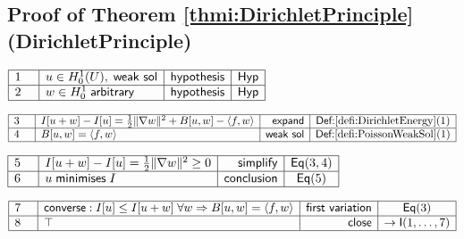 \documentclass[11pt,reqno]{amsart}
\begin{document}
	\subsection*{Proof of Theorem \protect\ref{thmi:DirichletPrinciple} (\textsf{DirichletPrinciple})}
	\noindent$\begin{array}{|m{0.5cm}|l|r|c|}
	\hline
	1 & u\in H_{0}^{1}(U),\;\mathsf{weak\ sol} & \mathsf{hypothesis} & \mathsf{Hyp} \\ \hline
	2 & w\in H_{0}^{1}\;\mathsf{arbitrary} & \mathsf{hypothesis} & \mathsf{Hyp} \\ \hline
	\end{array}$
	\par\nointerlineskip\noindent$\begin{array}{|m{0.5cm}|l|r|c|}
	\hline
	3 & I[u+w]-I[u]=\tfrac12\|\nabla w\|^{2}+B[u,w]-\langle f,w\rangle & \mathsf{expand} & \textsf{Def:}\ref{defi:DirichletEnergy}(1) \\ \hline
	4 & B[u,w]=\langle f,w\rangle & \mathsf{weak\ sol} & \textsf{Def:}\ref{defi:PoissonWeakSol}(1) \\ \hline
	\end{array}$
	\par\nointerlineskip\noindent$\begin{array}{|m{0.5cm}|l|r|c|}
	\hline
	5 & I[u+w]-I[u]=\tfrac12\|\nabla w\|^{2}\ge0 & \mathsf{simplify} & \mathsf{Eq}(3,4) \\ \hline
	6 & u\;\mathsf{minimises}\;I & \mathsf{conclusion} & \mathsf{Eq}(5) \\ \hline
	\end{array}$
	\par\nointerlineskip\noindent$\begin{array}{|m{0.5cm}|l|r|c|}
	\hline
	7 & \mathsf{converse:\;}I[u]\le I[u+w]\;\forall w\Rightarrow B[u,w]=\langle f,w\rangle & \mathsf{first\ variation} & \mathsf{Eq}(3) \\ \hline
	8 & \top & \mathsf{close} & \to\mathsf{I}(1,\dots,7) \\ \hline
	\end{array}$
	\medskip
	
\end{document}
